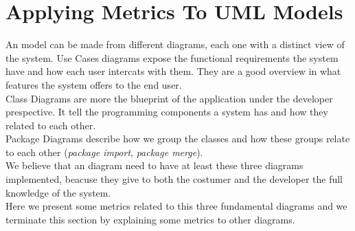 \section{Applying Metrics To UML Models}\label{metrics}
An \umlS model can be made from different diagrams, each one with a distinct view of the system. Use Cases diagrams expose
the functional requirements the system have and how each user intercats with them. They are a good overview in what
features the system offers to the end user.\\
Class Diagrams are more the blueprint of the application under the developer prespective. It tell the programming components a system has and
how they related to each other.\\
Package Diagrams describe how we group the classes and how these groups relate to each other (\textit{package import}, \textit{package merge}).\\
\indent We believe that an \umlS diagram need to have at least these three diagrams implemented, beacuse they give to both the costumer and the developer
the full knowledge of the system.\\
\indent Here we present some metrics related to this three fundamental diagrams and we terminate this section by explaining some metrics to other \umlS diagrams.

